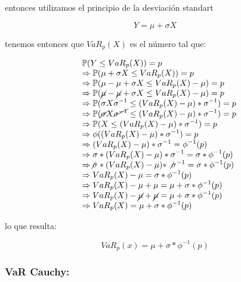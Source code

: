 \documentclass[]{article}
\begin{document}
entonces utilizamos el principio de la desviación standart

\[Y = \mu + \sigma X\]

tenemos entonces que \(VaR_{p}(X)\) es el número tal que:

\[
\begin{array}{rl}
&\displaystyle \mathbb{P}(Y \leq VaR_{p}(X)) = p\\
&\displaystyle \Rightarrow \mathbb{P}(\mu + \sigma X \leq VaR_{p}(X)) = p\\
&\displaystyle \Rightarrow \mathbb{P}(\mu - \mu + \sigma X \leq VaR_{p}(X)- \mu) = p\\
&\displaystyle \Rightarrow \mathbb{P}(\cancel{\mu} - \cancel{\mu} + \sigma X \leq VaR_{p}(X)- \mu) = p\\
&\displaystyle \Rightarrow \mathbb{P}(\sigma X \sigma^{-1} \leq (VaR_{p}(X) -\mu) * \sigma^{-1}) = p\\
&\displaystyle \Rightarrow \mathbb{P}(\cancel{\sigma} X \cancel{\sigma^{-1}} \leq (VaR_{p}(X) -\mu) * \sigma^{-1}) = p\\
&\displaystyle \Rightarrow \mathbb{P}(X \leq (VaR_{p}(X) -\mu) * \sigma^{-1}) = p\\
&\displaystyle \Rightarrow \phi((VaR_{p}(X) -\mu) * \sigma^{-1}) = p\\
&\displaystyle \Rightarrow (VaR_{p}(X) -\mu) * \sigma^{-1} = \phi^{-1}(p)\\
&\displaystyle \Rightarrow \sigma * {(VaR_{p}(X) -\mu) * \sigma^{-1}} = \sigma * \phi^{-1}(p)\\
&\displaystyle \Rightarrow \not{\sigma} * {(VaR_{p}(X) -\mu) * \not{\sigma^{-1}}} = \sigma * \phi^{-1}(p)\\
&\displaystyle \Rightarrow VaR_{p}(X) -\mu = \sigma * \phi^{-1}(p)\\
&\displaystyle \Rightarrow VaR_{p}(X) -\mu + \mu = \mu + \sigma * \phi^{-1}(p)\\
&\displaystyle \Rightarrow VaR_{p}(X) -\cancel{\mu} + \cancel{\mu} = \mu + \sigma * \phi^{-1}(p)\\
&\displaystyle \Rightarrow VaR_{p}(X) = \mu + \sigma * \phi^{-1}(p)
\end{array}\]

lo que resulta:

\[VaR_p(x)=\mu+\sigma* \phi^{-1}(p)\]

\hypertarget{var-cauchy}{%
\subsubsection{\texorpdfstring{\textbf{VaR
Cauchy:}}{VaR Cauchy:}}\label{var-cauchy}}
\end{document}
